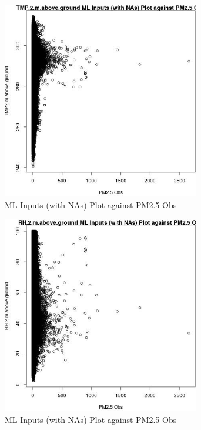 \begin{figure} 
\centering  
\includegraphics[width=0.77\textwidth]{Code_Outputs/Report_ML_input_PM25_Step4_part_e_de_duplicated_aves_compiled_2019-05-20wNAs_TMP2mabovegroundvPM25_Obs.jpg} 
\caption{\label{fig:Report_ML_input_PM25_Step4_part_e_de_duplicated_aves_compiled_2019-05-20wNAsTMP2mabovegroundvPM25_Obs}ML Inputs (with NAs) Plot against PM2.5 Obs} 
\end{figure} 
 

\begin{figure} 
\centering  
\includegraphics[width=0.77\textwidth]{Code_Outputs/Report_ML_input_PM25_Step4_part_e_de_duplicated_aves_compiled_2019-05-20wNAs_RH2mabovegroundvPM25_Obs.jpg} 
\caption{\label{fig:Report_ML_input_PM25_Step4_part_e_de_duplicated_aves_compiled_2019-05-20wNAsRH2mabovegroundvPM25_Obs}ML Inputs (with NAs) Plot against PM2.5 Obs} 
\end{figure} 
 

